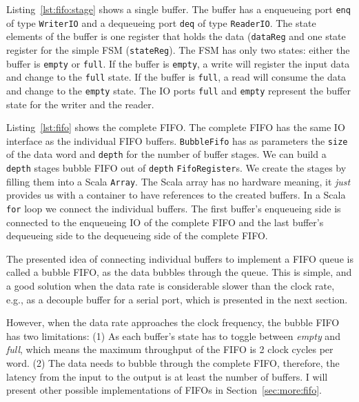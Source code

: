 \documentclass[%
    10pt,
    headinclude, footexclude,
    openright, %
    notitlepage,
    cleardoubleempty,
    headsepline,
    pointlessnumbers,
    bibtotoc, idxtotoc,
    ]{scrbook}
\newcommand{\code}[1]{{\small{\texttt{#1}}}}
\begin{document}

Listing~\ref{lst:fifo:stage} shows a single buffer. The buffer has a enqueueing port
\code{enq} of type \code{WriterIO} and a dequeueing port \code{deq} of type
\code{ReaderIO}. The state elements of the buffer is one register that holds the
data (\code{dataReg} and one state register for the simple FSM (\code{stateReg}).
The FSM has only two states: either the buffer is \code{empty} or \code{full}.
If the buffer is \code{empty}, a write will register the input data and change
to the \code{full} state.
If the buffer is \code{full}, a read will consume the data and change to the
\code{empty} state.
The IO ports \code{full} and \code{empty} represent the buffer state for
the writer and the reader.


Listing~\ref{lst:fifo} shows the complete FIFO. The complete FIFO has
the same IO interface as the individual FIFO buffers.
\code{BubbleFifo} has as parameters the \code{size} of the data
word and \code{depth} for the number of buffer stages.
We can build a \code{depth} stages bubble FIFO out of \code{depth}
\code{FifoRegister}s. We create the stages by filling them into a Scala \code{Array}.
The Scala array has no hardware meaning, it \emph{just} provides us with
a container to have references to the created buffers.
In a Scala \code{for} loop we connect the individual buffers.
The first buffer's enqueueing side is connected to the enqueueing IO of
the complete FIFO and the last buffer's dequeueing side to the
dequeueing side of the complete FIFO.


The presented idea of connecting individual buffers to implement a FIFO
queue is called a bubble FIFO, as the data bubbles through the queue.
This is simple, and a good solution when the data rate is considerable slower
than the clock rate, e.g., as a decouple buffer for a serial port, which is presented
in the next section.

However, when the data rate approaches the clock frequency, the bubble FIFO
has two limitations: (1) As each buffer's state has to toggle between \emph{empty} and
\emph{full}, which means the maximum throughput of the FIFO is 2 clock cycles
per word. (2) The data needs to bubble through the complete FIFO, therefore,
the latency from the input to the output is at least the number of buffers.
I will present other possible implementations of FIFOs in Section~\ref{sec:more:fifo}.
\end{document}
